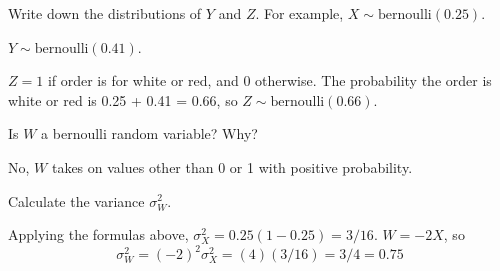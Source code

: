 \documentclass[12pt, addpoints]{exam}
\begin{document}
\begin{questions}

\question[4]
Write down the distributions of $Y$ and $Z$.
For example, $X \sim \text{bernoulli}(0.25)$.

\begin{solution} 
$Y \sim \text{bernoulli}(0.41)$.

$Z = 1$ if order is for white or red, and 0 otherwise.
The probability the order is white or red is 0.25 + 0.41 = 0.66, so $Z \sim \text{bernoulli}(0.66)$.
\end{solution}

\question[2]
Is $W$ a bernoulli random variable? Why?

\begin{solution} 
No, $W$ takes on values other than 0 or 1 with positive probability.
\end{solution}


\question[4]
Calculate the variance $\sigma^2_W$.

\begin{solution} 
Applying the formulas above, $\sigma^2_X = 0.25(1 - 0.25) = 3/16$.
$W = -2X$, so 
\[
\sigma^2_W = (-2)^2 \sigma^2_X = (4)(3/16) = 3/4 = 0.75
\]
\end{solution}


\end{questions}

\newpage
\begin{center}
\gradetable[v][questions]
\end{center}
\end{document}
